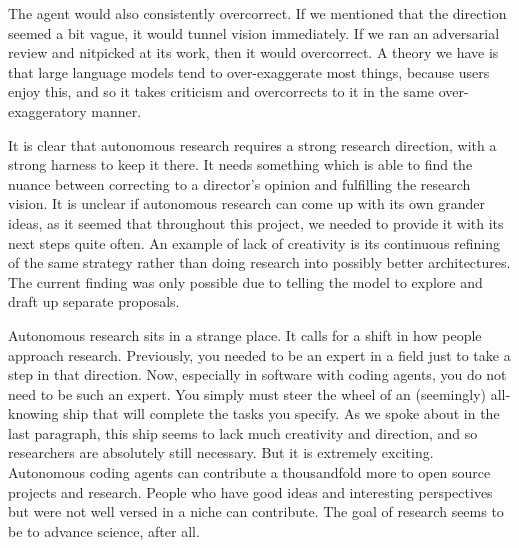\documentclass{article}
\begin{document}
The agent would also consistently overcorrect. If we mentioned that the direction seemed a bit vague, it would tunnel
vision immediately. If we ran an adversarial review and nitpicked at its work, then it would overcorrect. A theory we have
is that large language models tend to over-exaggerate most things, because users enjoy this, and so it takes criticism and
overcorrects to it in the same over-exaggeratory manner.

It is clear that autonomous research requires a strong research direction, with a strong harness to keep it there. It needs
something which is able to find the nuance between correcting to a director's opinion and fulfilling the research vision. It
is unclear if autonomous research can come up with its own grander ideas, as it seemed that throughout this project, we
needed to provide it with its next steps quite often. An example of lack of creativity is its continuous refining of the
same strategy rather than doing research into possibly better architectures. The current finding was only possible due to
telling the model to explore and draft up separate proposals.

Autonomous research sits in a strange place. It calls for a shift in how people approach research. Previously, you needed to
be an expert in a field just to take a step in that direction. Now, especially in software with coding agents, you do not
need to be such an expert. You simply must steer the wheel of an (seemingly) all-knowing ship that will complete the tasks
you specify. As we spoke about in the last paragraph, this ship seems to lack much creativity and direction, and so
researchers are absolutely still necessary. But it is extremely exciting. Autonomous coding agents can contribute a
thousandfold more to open source projects and research. People who have good ideas and interesting perspectives but were
not well versed in a niche can contribute. The goal of research seems to be to advance science, after all.

\clearpage
\appendix
\end{document}
